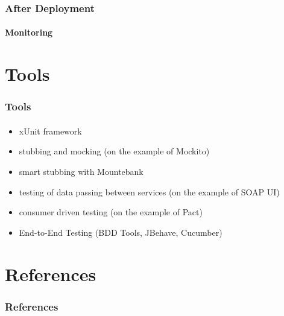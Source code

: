\documentclass{beamer}
\begin{document}
\begin{frame}
	\frametitle{After Deployment}
	\framesubtitle{Monitoring}
\end{frame}

\section{Tools}

\begin{frame}
	\frametitle{Tools}
	\framesubtitle{}
	\begin{itemize}
		\item xUnit framework
		\item stubbing and mocking (on the example of Mockito)
		\item smart stubbing with Mountebank
		\item testing of data passing between services (on the example of SOAP UI)
		\item consumer driven testing (on the example of Pact)
		\item End-to-End Testing (BDD Tools, JBehave, Cucumber)
	\end{itemize}
\end{frame}

\section{References}
\begin{frame}
	\frametitle{References}
	\framesubtitle{}

        \nocite{newman,cohn,infosys,clemson,fowler_cont_del,naik}
	
\end{frame}

\end{document}
